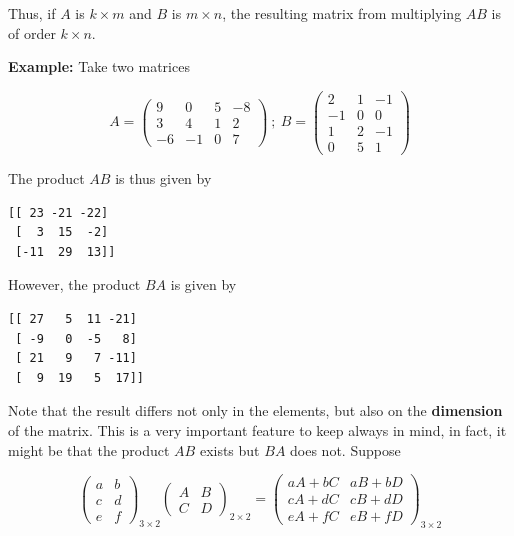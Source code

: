 \documentclass[a4paper,11pt]{article}
\theoremstyle{definition}
\theoremstyle{plain}
\begin{document}
Thus, if \(A\) is \(k\times m\) and \(B\) is \(m\times n\), the
resulting matrix from multiplying \(AB\) is of order \(k\times n\).

\textbf{Example:} Take two matrices

\[
A = \begin{pmatrix} 9 & 0 & 5 & -8 \\ 3 & 4 & 1 & 2 \\ -6 & -1 & 0 & 7 \end{pmatrix} \: ; \: B = \begin{pmatrix} 2 & 1 & -1 \\ -1 & 0 & 0 \\ 1 & 2 & -1 \\ 0 & 5 & 1 \end{pmatrix}
\]

The product \(AB\) is thus given by

    \begin{Verbatim}[commandchars=\\\{\}]
[[ 23 -21 -22]
 [  3  15  -2]
 [-11  29  13]]

    \end{Verbatim}

    However, the product \(BA\) is given by

    \begin{Verbatim}[commandchars=\\\{\}]
[[ 27   5  11 -21]
 [ -9   0  -5   8]
 [ 21   9   7 -11]
 [  9  19   5  17]]

    \end{Verbatim}

    Note that the result differs not only in the elements, but also on the
\textbf{dimension} of the matrix. This is a very important feature to
keep always in mind, in fact, it might be that the product \(AB\) exists
but \(BA\) does not. Suppose

\[
\begin{pmatrix} a & b \\ c & d \\ e & f \end{pmatrix}_{3\times 2} \begin{pmatrix} A & B \\ C & D \end{pmatrix}_{2\times 2} = \begin{pmatrix} aA + bC & aB + bD \\ cA + dC & cB + dD \\ eA + fC & eB + fD \end{pmatrix}_{3\times 2}
\]
\end{document}
